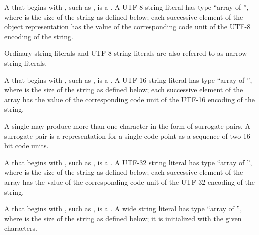 \pnum
{}%
A  that begins with ,
%
such as , is a .
A UTF-8 string literal
has type ``array of  '',
where  is the size of the string as defined below;
each successive element of the object representation has
the value of the corresponding code unit of the UTF-8 encoding of the string.

\pnum
{}%
Ordinary string literals and UTF-8 string literals are
also referred to as narrow string literals.

\pnum
{}%
%
%
A  that begins with ,
%
such as , is
a .
A UTF-16 string literal has
type ``array of  '', where  is the
size of the string as defined below;
each successive element of the array
has the value of the corresponding code unit of
the UTF-16 encoding of the string.
\begin{note}
A single  may
produce more than one  character in the form of
surrogate pairs.
A surrogate pair is a representation for a single code point
as a sequence of two 16-bit code units.
\end{note}

\pnum
{}%
%
%
A  that begins with ,
%
such as , is
a .
A UTF-32 string literal has
type ``array of  '', where  is the
size of the string as defined below;
each successive element of the array
has the value of the corresponding code unit of
the UTF-32 encoding of the string.

\pnum
{}%
A  that begins with ,
%
such as , is a .
%
%
%
%
A wide string literal has type ``array of  '', where  is the size of the string as defined below; it
is initialized with the given characters.

